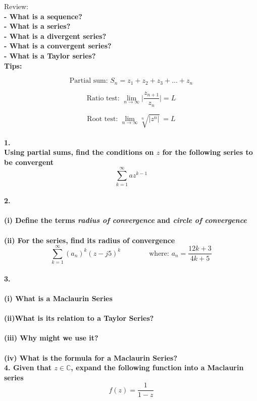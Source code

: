 \documentclass{article}
\author{Alex Hiller}
\title{}
\newcommand{\begeq}[1]{\begin{equation} \label{eq:#1}}
\newcommand{\eeq}{\end{equation}}
\newcommand{\question}[1]{\textbf{#1} \\}   %
\begin{document}
Review: \\
\question{- What is a sequence?           \\
          - What is a series?             \\
          - What is a divergent series?   \\
          - What is a convergent series?  \\
          - What is a Taylor series?      }

\textbf{Tips:\\}

\begeq{partial_sum}
  \text{Partial sum: \ \ \ }
  S_n = z_1 + z_2 + z_3 + ... + z_n
\eeq 

\begeq{ratio_test}
  \text{Ratio test: \ \ \ }
  \lim_{n \rightarrow \infty} \bigg| \frac{z_{n+1}}{z_n}  \bigg| = L
\eeq

\begeq{root_test}
  \text{Root test: \ \ \ }
  \lim_{n \rightarrow \infty} \sqrt[n]{|z^n|} \ = L
\eeq \\


\question{1.\\ Using partial sums, find the conditions on $z$ for the following series to be convergent}
\begeq{q2}
  \sum^{\infty}_{k=1} az^{k-1}
\eeq \\


\question{2.\\ }
\question{(i)  Define the terms \textit{radius of convergence} and \textit{circle of convergence} \\ }
\question{(ii) For the series, find its radius of convergence}
  \begeq{rad_of_conv}
    \sum^{\infty}_{k=1} (a_n)^k (z - j5)^k 
    \qquad \qquad \text{where: \ \ }a_n = \frac{12k+3}{4k+5}
  \eeq \\

\question{3. \\}
\question{(i) What is a Maclaurin Series \\ }
\question{(ii)What is its relation to a Taylor Series? \\}
\question{(iii) Why might we use it?\\ }
\question{(iv) What is the formula for a Maclaurin Series? }

\question{4. Given that $z \in \mathbb{C}$, expand the following function into a Maclaurin series}
  \begeq{common_function}
    f(z) = \frac{1}{1-z}
  \eeq
\end{document}
